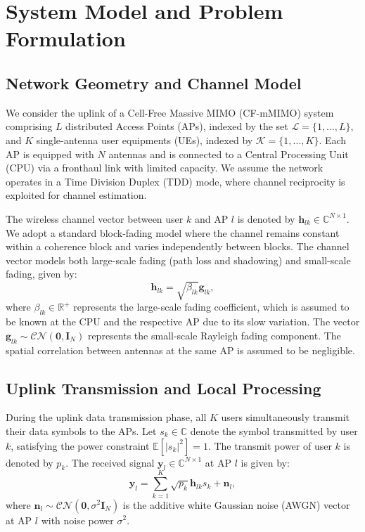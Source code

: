 \section{System Model and Problem Formulation}

\subsection{Network Geometry and Channel Model}
We consider the uplink of a Cell-Free Massive MIMO (CF-mMIMO) system comprising $L$ distributed Access Points (APs), indexed by the set $\mathcal{L} = \{1, \dots, L\}$, and $K$ single-antenna user equipments (UEs), indexed by $\mathcal{K} = \{1, \dots, K\}$. Each AP is equipped with $N$ antennas and is connected to a Central Processing Unit (CPU) via a fronthaul link with limited capacity. We assume the network operates in a Time Division Duplex (TDD) mode, where channel reciprocity is exploited for channel estimation.

The wireless channel vector between user $k$ and AP $l$ is denoted by $\mathbf{h}_{lk} \in \mathbb{C}^{N \times 1}$. We adopt a standard block-fading model where the channel remains constant within a coherence block and varies independently between blocks. The channel vector models both large-scale fading (path loss and shadowing) and small-scale fading, given by:
\begin{equation}
    \mathbf{h}_{lk} = \sqrt{\beta_{lk}} \mathbf{g}_{lk},
\end{equation}
where $\beta_{lk} \in \mathbb{R}^+$ represents the large-scale fading coefficient, which is assumed to be known at the CPU and the respective AP due to its slow variation. The vector $\mathbf{g}_{lk} \sim \mathcal{CN}(\mathbf{0}, \mathbf{I}_N)$ represents the small-scale Rayleigh fading component. The spatial correlation between antennas at the same AP is assumed to be negligible.

\subsection{Uplink Transmission and Local Processing}
During the uplink data transmission phase, all $K$ users simultaneously transmit their data symbols to the APs. Let $s_k \in \mathbb{C}$ denote the symbol transmitted by user $k$, satisfying the power constraint $\mathbb{E}[|s_k|^2] = 1$. The transmit power of user $k$ is denoted by $p_k$. The received signal $\mathbf{y}_l \in \mathbb{C}^{N \times 1}$ at AP $l$ is given by:
\begin{equation}
    \mathbf{y}_l = \sum_{k=1}^K \sqrt{p_k} \mathbf{h}_{lk} s_k + \mathbf{n}_l,
\end{equation}
where $\mathbf{n}_l \sim \mathcal{CN}(\mathbf{0}, \sigma^2 \mathbf{I}_N)$ is the additive white Gaussian noise (AWGN) vector at AP $l$ with noise power $\sigma^2$.

